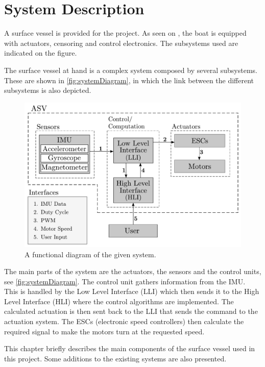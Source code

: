 \chapter{System Description}
A surface vessel is provided for the project. As seen on , the boat is equipped with actuators, censoring and control electronics. The subsystems used are indicated on the figure.

The surface vessel at hand is a complex system composed by several subsystems. These are shown in \autoref{fig:systemDiagram}, in which the link between the different subsystems is also depicted.
%
\begin{figure}[H]
    \includegraphics[width=.65\textwidth]{figures/systemDiagram4}
    \caption{A functional diagram of the given system.}
    \label{fig:systemDiagram}
\end{figure}
%
The main parts of the system are the actuators, the sensors and the control units, see \autoref{fig:systemDiagram}. The control unit gathers information from the IMU. This is handled by the Low Level Interface (LLI) which then sends it to the High Level Interface (HLI) where the control algorithms are implemented. The calculated actuation is then sent back to the LLI that sends the command to the actuation system. The ESCs (electronic speed controllers) then calculate the required signal to make the motors turn at the requested speed. 

This chapter briefly describes the main components of the surface vessel used in this project. Some additions to the existing systems are also presented. \cite{aauship}

